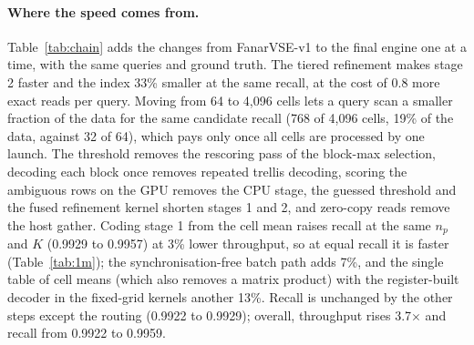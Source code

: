 \documentclass[fleqn,10pt]{wlscirep}
\begin{document}
\paragraph{Where the speed comes from.} Table~\ref{tab:chain} adds the changes from FanarVSE-v1 to the final engine one at a time, with the same queries and ground truth. The tiered refinement makes stage 2 faster and the index 33\% smaller at the same recall, at the cost of 0.8 more exact reads per query. Moving from 64 to 4{,}096 cells lets a query scan a smaller fraction of the data for the same candidate recall (768 of 4{,}096 cells, 19\% of the data, against 32 of 64), which pays only once all cells are processed by one launch. The threshold removes the rescoring pass of the block-max selection, decoding each block once removes repeated trellis decoding, scoring the ambiguous rows on the GPU removes the CPU stage, the guessed threshold and the fused refinement kernel shorten stages 1 and 2, and zero-copy reads remove the host gather. Coding stage 1 from the cell mean raises recall at the same $n_p$ and $K$ (0.9929 to 0.9957) at 3\% lower throughput, so at equal recall it is faster (Table~\ref{tab:1m}); the synchronisation-free batch path adds 7\%, and the single table of cell means (which also removes a matrix product) with the register-built decoder in the fixed-grid kernels another 13\%. Recall is unchanged by the other steps except the routing (0.9922 to 0.9929); overall, throughput rises 3.7$\times$ and recall from 0.9922 to 0.9959.
\end{document}
